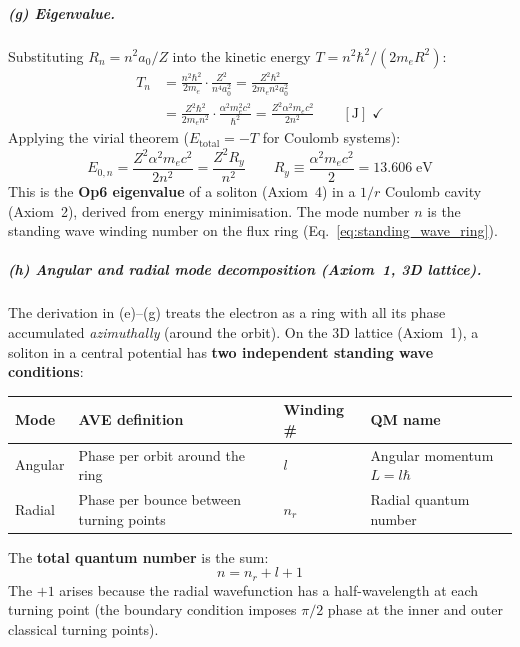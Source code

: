 \subparagraph{(g) Eigenvalue.}
Substituting $R_n = n^2 a_0 / Z$ into the kinetic
energy $T = n^2\hbar^2/(2m_e R^2)$:
\begin{align}
    T_n &= \frac{n^2 \hbar^2}{2 m_e}
    \cdot \frac{Z^2}{n^4 a_0^2}
    = \frac{Z^2 \hbar^2}{2 m_e n^2 a_0^2}
    \nonumber \\
    &= \frac{Z^2 \hbar^2}{2 m_e n^2}
    \cdot \frac{\alpha^2 m_e^2 c^2}{\hbar^2}
    = \frac{Z^2 \alpha^2 m_e c^2}{2 n^2}
    \qquad [\text{J}]\;\checkmark
\end{align}
Applying the virial theorem ($E_{\text{total}} = -T$
for Coulomb systems):
\begin{equation}
    \boxed{E_{0,n}
    = \frac{Z^2 \alpha^2 m_e c^2}{2 n^2}
    = \frac{Z^2 R_y}{n^2}}
    \qquad R_y \equiv \frac{\alpha^2 m_e c^2}{2}
    = 13.606\;\text{eV}
    \label{eq:E0_eigenvalue}
\end{equation}
This is the \textbf{Op6 eigenvalue} of a soliton
(Axiom~4) in a $1/r$ Coulomb cavity (Axiom~2),
derived from energy minimisation.  The mode number
$n$ is the standing wave winding number on the
flux ring (Eq.~\ref{eq:standing_wave_ring}).

\subparagraph{(h) Angular and radial mode decomposition
(Axiom~1, 3D lattice).}

The derivation in (e)--(g) treats the electron as
a ring with all its phase accumulated \emph{azimuthally}
(around the orbit).  On the 3D lattice (Axiom~1),
a soliton in a central potential has \textbf{two
independent standing wave conditions}:

\begin{center}
\small
\renewcommand{\arraystretch}{1.2}
\begin{tabular}{llll}
\hline
\textbf{Mode} & \textbf{AVE definition} &
\textbf{Winding \#} & \textbf{QM name} \\
\hline
Angular & Phase per orbit around the ring &
$l$ & Angular momentum $L = l\hbar$ \\
Radial & Phase per bounce between turning points &
$n_r$ & Radial quantum number \\
\hline
\end{tabular}
\end{center}
The \textbf{total quantum number} is the sum:
\begin{equation}
    \boxed{n = n_r + l + 1}
    \label{eq:n_decomposition}
\end{equation}
The $+1$ arises because the radial wavefunction
has a half-wavelength at each turning point
(the boundary condition imposes $\pi/2$ phase
at the inner and outer classical turning points).

